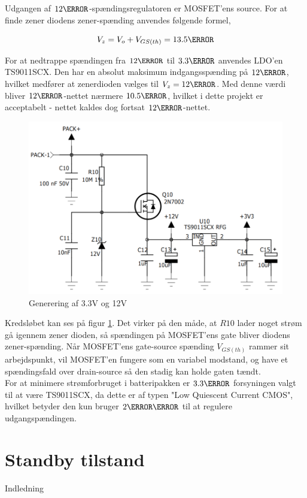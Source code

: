 Udgangen af $12\volt$-spændingsregulatoren er MOSFET'ens source. For at finde zener diodens zener-spænding anvendes følgende formel,

\begin {equation} 
V_{z} = V_{o} + V_{GS(th)} = 13.5\volt
\end {equation}

For at nedtrappe spændingen fra $12\volt$ til $3.3\volt$ anvendes LDO'en TS9011SCX. Den har en absolut maksimum indgangsspænding på $12\volt$, hvilket medfører at zenerdioden vælges til $V_{z}=12\volt$. Med denne værdi bliver $12\volt$-nettet nærmere $10.5\volt$, hvilket i dette projekt er acceptabelt - nettet kaldes dog fortsat $12\volt$-nettet.

\begin{figure}[h]
	\centering
	\includegraphics[width=12cm]{billeder/voltage_nets.png}
	\caption{Generering af 3.3V og 12V}
	\label{fig:voltage_nets}
\end{figure}

Kredsløbet kan ses på figur \ref{fig:voltage_nets}. Det virker på den måde, at $R10$ lader noget strøm gå igennem zener dioden, så spændingen på MOSFET'ens gate bliver diodens zener-spænding. Når MOSFET'ens gate-source spænding $V_{GS(th)}$ rammer sit arbejdspunkt, vil MOSFET'en fungere som en variabel modstand, og have et spændingsfald over drain-source så den stadig kan holde gaten tændt.
\\

For at minimere strømforbruget i batteripakken er $3.3\volt$ forsyningen valgt til at være TS9011SCX, da dette er af typen "Low Quiescent Current CMOS", hvilket betyder den kun bruger $2\micro\ampere$ til at regulere udgangspændingen.

\section{Standby tilstand}
Indledning

